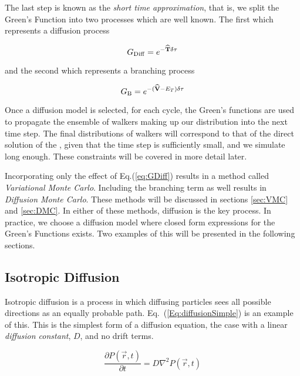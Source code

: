 The last step is known as the \textit{short time approximation}, that is, we split the Green's Function into two processes which are well known. The first which represents a diffusion process

\begin{equation}
\label{eq:GDiff}
 G_\mathrm{Diff} = e^{-{\bf\widehat{T}}\delta\tau}
\end{equation}

and the second which represents a branching process

\begin{equation}
 \label{eq:GB}
 G_\mathrm{B} = e^{-({\bf\widehat{V}} - E_T)\delta\tau}
\end{equation}

Once a diffusion model is selected, for each cycle, the Green's functions are used to propagate the ensemble of walkers making up our distribution into the next time step. The final distributions of walkers will correspond to that of the direct solution of the \schrodinger, given that the time step is sufficiently small, and we simulate long enough. These constraints will be covered in more detail later. 

Incorporating only the effect of Eq.(\ref{eq:GDiff}) results in a method called \textit{Variational Monte Carlo}. Including the branching term as well results in \textit{Diffusion Monte Carlo}. These methods will be discussed in sections \ref{sec:VMC} and \ref{sec:DMC}. In either of these methods, diffusion is the key process. In practice, we choose a diffusion model where closed form expressions for the Green's Functions exists. Two examples of this will be presented in the following sections.



\subsection{Isotropic Diffusion}

Isotropic diffusion is a process in which diffusing particles sees all possible directions as an equally probable path. Eq.~(\ref{Eq:diffusionSimple}) is an example of this. This is the simplest form of a diffusion equation, the case with a linear \textit{diffusion constant}, $D$, and no drift terms.

\begin{equation}
 \label{Eq:diffusionSimple}
 \frac{\partial P(\vec r, t)}{\partial t} = D\nabla^2 P(\vec r, t) 
\end{equation}


